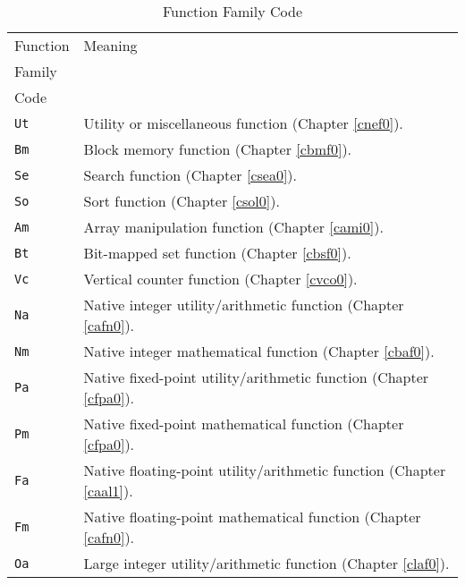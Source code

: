 \begin{table}
\caption{\emph{\productbasenameshort{}} Function Family Code}
\label{tbl:cldd0:slcv0:sfnc0:03}
\begin{center}
\begin{tabular}{|l|l|}
\hline
Function       & Meaning                                                                     \\
Family         &                                                                             \\
Code           &                                                                             \\
\hline
\hline
\texttt{Ut}    & Utility or miscellaneous function (Chapter \ref{cnef0}).                    \\
\hline
\texttt{Bm}    & Block memory function (Chapter \ref{cbmf0}).                                \\
\hline
\texttt{Se}    & Search function (Chapter \ref{csea0}).                                      \\
\hline
\texttt{So}    & Sort function (Chapter \ref{csol0}).                                        \\
\hline
\texttt{Am}    & Array manipulation function (Chapter \ref{cami0}).                          \\
\hline
\texttt{Bt}    & Bit-mapped set function (Chapter \ref{cbsf0}).                              \\
\hline
\texttt{Vc}    & Vertical counter function (Chapter \ref{cvco0}).                            \\
\hline
\texttt{Na}    & Native integer utility/arithmetic function (Chapter \ref{cafn0}).           \\
\hline
\texttt{Nm}    & Native integer mathematical function (Chapter \ref{cbaf0}).                 \\
\hline
\texttt{Pa}    & Native fixed-point utility/arithmetic function (Chapter \ref{cfpa0}).       \\
\hline
\texttt{Pm}    & Native fixed-point mathematical function (Chapter \ref{cfpa0}).             \\
\hline
\texttt{Fa}    & Native floating-point utility/arithmetic function (Chapter \ref{caal1}).    \\
\hline
\texttt{Fm}    & Native floating-point mathematical function (Chapter \ref{cafn0}).          \\
\hline
\texttt{Oa}    & Large integer utility/arithmetic function (Chapter \ref{claf0}).            \\

\end{tabular}
\end{center}
\end{table}
